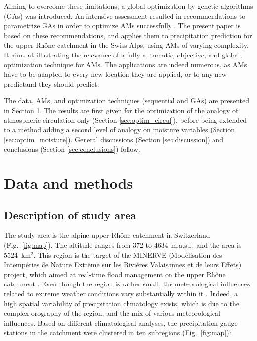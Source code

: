 \documentclass[review]{elsarticle}
\begin{document}
Aiming to overcome these limitations, a global optimization by genetic algorithms (GAs) was introduced. An intensive assessment resulted in recommendations to parametrize GAs in order to optimize AMs successfully \citep{Horton2016}. The present paper is based on these recommendations, and applies them to precipitation prediction for the upper Rh\^{o}ne catchment in the Swiss Alps, using AMs of varying complexity. It aims at illustrating the relevance of a fully automatic, objective, and global, optimization technique for AMs. The applications are indeed numerous, as AMs have to be adapted to every new location they are applied, or to any new predictand they should predict.

The data, AMs, and optimization techniques (sequential and GAs) are presented in Section \ref{sec:data_methods}. The results are first given for the optimization of the analogy of atmospheric circulation only (Section \ref{sec:optim_circul}), before being extended to a method adding a second level of analogy on moisture variables (Section \ref{sec:optim_moisture}). General discussions (Section \ref{sec:discussion}) and conclusions (Section \ref{sec:conclusions}) follow.


\section{Data and methods}
\label{sec:data_methods}


\subsection{Description of study area}
\label{sec:case_study}

The study area is the alpine upper Rh\^{o}ne catchment in Switzerland (Fig.\ \ref{fig:map}). The altitude ranges from 372 to 4634~m.a.s.l.\ and the area is 5524~km$^{2}$. This region is the target of the MINERVE (Mod\'{e}lisation des Intemp\'{e}ries de Nature Extr\^{e}me sur les Rivi\`{e}res Valaisannes et de leurs Effets) project, which aimed at real-time flood management on the upper Rh\^{o}ne catchment \citep{GarciaHernandez2009b}. Even though the region is rather small, the meteorological influences related to extreme weather conditions vary substantially within it \citep[see][]{Horton2012}. Indeed, a high spatial variability of precipitation climatology exists, which is due to the complex orography of the region, and the mix of various meteorological influences. Based on different climatological analyses, the precipitation gauge stations in the catchment were clustered in ten subregions (Fig.\ \ref{fig:map}):
\end{document}
